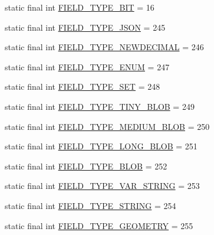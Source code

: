 \begin{DoxyCompactItemize}
\item 
static final int \mbox{\hyperlink{enumcom_1_1mysql_1_1cj_1_1_mysql_type_ae9b16ded3ab15df60484d8cd72d57445}{F\+I\+E\+L\+D\+\_\+\+T\+Y\+P\+E\+\_\+\+B\+IT}} = 16
\item 
static final int \mbox{\hyperlink{enumcom_1_1mysql_1_1cj_1_1_mysql_type_aadc8487d4355e8d56b00a203df999374}{F\+I\+E\+L\+D\+\_\+\+T\+Y\+P\+E\+\_\+\+J\+S\+ON}} = 245
\item 
static final int \mbox{\hyperlink{enumcom_1_1mysql_1_1cj_1_1_mysql_type_a082e76a77ae3f5fc6648a1480f86cb8f}{F\+I\+E\+L\+D\+\_\+\+T\+Y\+P\+E\+\_\+\+N\+E\+W\+D\+E\+C\+I\+M\+AL}} = 246
\item 
static final int \mbox{\hyperlink{enumcom_1_1mysql_1_1cj_1_1_mysql_type_af147d78e6d19879a5c94d5130edd5300}{F\+I\+E\+L\+D\+\_\+\+T\+Y\+P\+E\+\_\+\+E\+N\+UM}} = 247
\item 
static final int \mbox{\hyperlink{enumcom_1_1mysql_1_1cj_1_1_mysql_type_ab41368e4040262ca9b5d2d487278a382}{F\+I\+E\+L\+D\+\_\+\+T\+Y\+P\+E\+\_\+\+S\+ET}} = 248
\item 
static final int \mbox{\hyperlink{enumcom_1_1mysql_1_1cj_1_1_mysql_type_a4254572aa52a4817cb0f57efdc7b6266}{F\+I\+E\+L\+D\+\_\+\+T\+Y\+P\+E\+\_\+\+T\+I\+N\+Y\+\_\+\+B\+L\+OB}} = 249
\item 
static final int \mbox{\hyperlink{enumcom_1_1mysql_1_1cj_1_1_mysql_type_a3166d3060176f3115899203f07161dda}{F\+I\+E\+L\+D\+\_\+\+T\+Y\+P\+E\+\_\+\+M\+E\+D\+I\+U\+M\+\_\+\+B\+L\+OB}} = 250
\item 
static final int \mbox{\hyperlink{enumcom_1_1mysql_1_1cj_1_1_mysql_type_ab45f39010f8b0c1a1a63371d7db696b3}{F\+I\+E\+L\+D\+\_\+\+T\+Y\+P\+E\+\_\+\+L\+O\+N\+G\+\_\+\+B\+L\+OB}} = 251
\item 
static final int \mbox{\hyperlink{enumcom_1_1mysql_1_1cj_1_1_mysql_type_acfe683ff8b22b0304d64aca065a34445}{F\+I\+E\+L\+D\+\_\+\+T\+Y\+P\+E\+\_\+\+B\+L\+OB}} = 252
\item 
static final int \mbox{\hyperlink{enumcom_1_1mysql_1_1cj_1_1_mysql_type_a592cb3469b8ae61df443a8b2898dd6cb}{F\+I\+E\+L\+D\+\_\+\+T\+Y\+P\+E\+\_\+\+V\+A\+R\+\_\+\+S\+T\+R\+I\+NG}} = 253
\item 
static final int \mbox{\hyperlink{enumcom_1_1mysql_1_1cj_1_1_mysql_type_af33c5594a7718c68ae6ce5df06c0e7db}{F\+I\+E\+L\+D\+\_\+\+T\+Y\+P\+E\+\_\+\+S\+T\+R\+I\+NG}} = 254
\item 
static final int \mbox{\hyperlink{enumcom_1_1mysql_1_1cj_1_1_mysql_type_a79694009751354f81a8c9240dad04e9d}{F\+I\+E\+L\+D\+\_\+\+T\+Y\+P\+E\+\_\+\+G\+E\+O\+M\+E\+T\+RY}} = 255
\end{DoxyCompactItemize}

